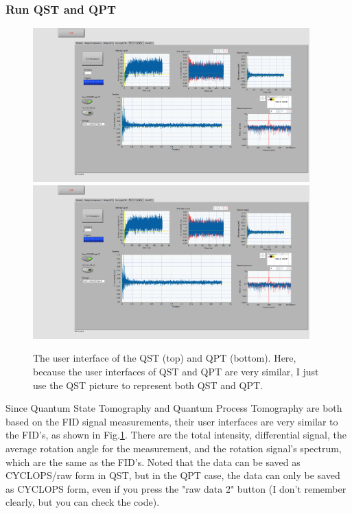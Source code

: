\documentclass{article}
\begin{document}
\subsubsection{Run QST and QPT}
\begin{figure}[htbp]
    \centering
    \includegraphics[width=0.95\textwidth]{fig/QST_signal.png}
    \vspace{0.5cm}
    \includegraphics[width=0.95\textwidth]{fig/QPT_signal.png}
    \caption{The user interface of the QST (top) and QPT (bottom). Here, because the user interfaces of QST and QPT are very similar, I just use the QST picture to represent both QST and QPT. }
    \label{fig:QST and QPT}
\end{figure}
Since Quantum State Tomography and Quantum Process Tomography are both based on the FID signal measurements, their user interfaces are very similar to the FID's, as shown in Fig.\ref{fig:QST and QPT}. There are the total intensity, differential signal, the average rotation angle for the measurement, and the rotation signal's spectrum, which are the same as the FID's. Noted that the data can be saved as CYCLOPS/raw form in QST, but in the QPT case, the data can only be saved as CYCLOPS form, even if you press the "raw data 2" button (I don't remember clearly, but you can check the code). 
\end{document}
